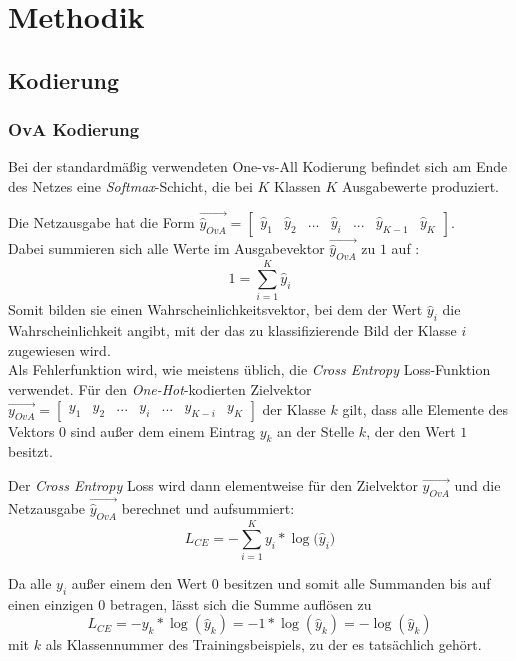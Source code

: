 \chapter{Methodik}
\label{ch:methodik}

\section{Kodierung}
\label{ch:methodik_kodierung}
\subsection{OvA Kodierung}
Bei der standardmäßig verwendeten One-vs-All Kodierung befindet sich am Ende des Netzes eine \textit{Softmax}-Schicht, die bei $K$ Klassen $K$ Ausgabewerte produziert.

Die Netzausgabe hat die Form $\overrightarrow{\widehat{y}_{OvA}} = \begin{bmatrix}
\widehat{y}_1 & \widehat{y}_2 & ... & \widehat{y}_i & ... & \widehat{y}_{K-1} & \widehat{y}_K
\end{bmatrix} $.\\

Dabei summieren sich alle Werte im Ausgabevektor $\overrightarrow{\widehat{y}_{OvA}}$ zu $1$ auf :
\[1 = \sum_{i=1}^K{\widehat{y}_i}\]
Somit bilden sie einen Wahrscheinlichkeitsvektor, bei dem der Wert $\widehat{y}_i$ die Wahrscheinlichkeit angibt, mit der das zu klassifizierende Bild der Klasse $i$ zugewiesen wird.\\

Als Fehlerfunktion wird, wie meistens üblich, die \textit{Cross Entropy} Loss-Funktion verwendet. Für den \textit{One-Hot}-kodierten Zielvektor \\
$\overrightarrow{y_{OvA}} = \begin{bmatrix} y_1 & y_2 & ... & y_i & ... & y_{K-i} & y_K \end{bmatrix}$ der Klasse $k$ gilt, dass alle Elemente des Vektors $0$ sind außer dem einem Eintrag $y_k$ an der Stelle $k$, der den Wert $1$ besitzt.


Der \textit{Cross Entropy} Loss wird dann elementweise für den Zielvektor $\overrightarrow{y_{OvA}}$ und die Netzausgabe $\overrightarrow{\widehat{y}_{OvA}}$ berechnet und aufsummiert:
\[L_{CE} = - \sum_{i=1}^K{y_i * \log{(\widehat{y}_i})}\]

Da alle $y_i$ außer einem den Wert $0$ besitzen und somit alle Summanden bis auf einen einzigen $0$ betragen, lässt sich die Summe auflösen zu 
\[L_{CE} = - y_k * \log{(\widehat{y}_k)} = -1 * \log{(\widehat{y}_k)} = - \log{(\widehat{y}_k)}\]
mit $k$ als Klassennummer des Trainingsbeispiels, zu der es tatsächlich gehört.

